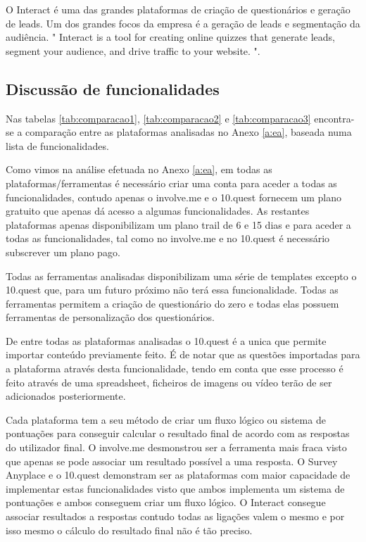 O Interact é uma das grandes plataformas de criação de questionários e geração de leads. Um dos grandes focos da empresa é a geração de leads e segmentação da audiência. " Interact is a tool for creating online quizzes that generate leads, segment your audience, and drive traffic to your website. "\cite{interact}.


\subsection{Discussão de funcionalidades}
\label{comparacao}

Nas tabelas \ref{tab:comparacao1}, \ref{tab:comparacao2} e \ref{tab:comparacao3} encontra-se a comparação entre as plataformas analisadas no Anexo \ref{a:ea}, baseada numa lista de funcionalidades.

Como vimos na análise efetuada no Anexo \ref{a:ea}, em todas as plataformas/ferramentas é necessário criar uma conta para aceder a todas as funcionalidades, contudo apenas o involve.me e o 10.quest fornecem um plano gratuito que apenas dá acesso a algumas funcionalidades. As restantes plataformas apenas disponibilizam um plano trail de 6 e 15 dias e para aceder a todas as funcionalidades, tal como no involve.me e no 10.quest é necessário subscrever um plano pago.

Todas as ferramentas analisadas disponibilizam uma série de templates excepto o 10.quest que, para um futuro próximo não terá essa funcionalidade. Todas as ferramentas permitem a criação de questionário do zero e todas elas possuem ferramentas de personalização dos questionários.

De entre todas as plataformas analisadas o 10.quest é a unica que permite importar conteúdo previamente feito. É de notar que as questões importadas para a plataforma através desta funcionalidade, tendo em conta que esse processo é feito através de uma spreadsheet, ficheiros de imagens ou vídeo terão de ser adicionados posteriormente.

Cada plataforma tem a seu método de criar um fluxo lógico ou sistema de pontuações para conseguir calcular o resultado final de acordo com as respostas do utilizador final. O involve.me desmonstrou ser a ferramenta mais fraca visto que apenas se pode associar um resultado possível a uma resposta. O Survey Anyplace e o 10.quest demonstram ser as plataformas com maior capacidade de implementar estas funcionalidades visto que ambos implementa um sistema de pontuações e ambos conseguem criar um fluxo lógico. O Interact consegue associar resultados a respostas contudo todas as ligações valem o mesmo e por isso mesmo o cálculo do resultado final não é tão preciso. 

